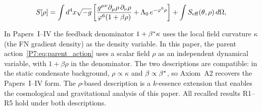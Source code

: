 

\begin{equation}
  S[\rho] = \int d^4x\sqrt{-g}\,
  \biggl[\frac{g^{\mu\nu}\partial_\mu\rho\,\partial_\nu\rho}
              {\varphi^6(1+\beta\rho)}
         + \Lambda_0\,e^{-\varphi^6\rho}\biggr]
  + \int S_{\mathrm{eff}}(\theta,\rho)\,d\Omega,
  \label{P7:eq:parent_action}
\end{equation}

\begin{remark}
\label{P7:rem:rho_extension}
In Papers~I--IV the feedback denominator $1+\beta^{*}\kappa$ uses the local
field curvature $\kappa$ (the FN gradient density) as the density variable.
In this paper, the parent action~\eqref{P7:eq:parent_action} uses a scalar
field $\rho$ as an independent dynamical variable, with $1+\beta\rho$ in
the denominator.  The two descriptions are compatible: in the static
condensate background, $\rho\propto\kappa$ and $\beta\propto\beta^{*}$, so
Axiom~A2 recovers the Papers~I--IV form.  The $\rho$-based description
is a $k$-essence extension that enables the cosmological and gravitational
analysis of this paper.  All recalled results R1--R5 hold under both
descriptions.
\end{remark}

